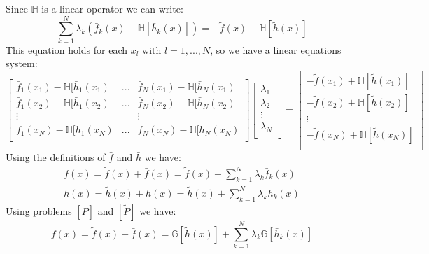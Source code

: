 Since $\mathbb{H}$ is a linear operator we can write:
\[
\sum_{k=1}^N\lambda_k\left(\bar f_k(x)-\mathbb{H}[\bar h_k(x)] \right) =-\widetilde{f}(x)+\mathbb{H}[\widetilde{h}(x)]
\]
This equation holds for each $x_l$ with $l=1,...,N$, so we have a linear equations system:
\begin{equation}
\begin{bmatrix}
\bar f_1(x_1)-\mathbb{H}[\bar h_1(x_1) & ... & \bar f_N(x_1)-\mathbb{H}[\bar h_N(x_1)\\
\bar f_1(x_2)-\mathbb{H}[\bar h_1(x_2) & ... & \bar f_N(x_2)-\mathbb{H}[\bar h_N(x_2)\\
\vdots & &\vdots\\
\bar f_1(x_N)-\mathbb{H}[\bar h_1(x_N) & ... & \bar f_N(x_N)-\mathbb{H}[\bar h_N(x_N)\\
\end{bmatrix}
\begin{bmatrix}
\lambda_1\\
\lambda_2\\
\vdots\\
\lambda_N\\
\end{bmatrix}
=
\begin{bmatrix}
-\widetilde{f}(x_1)+\mathbb{H}[\widetilde{h}(x_1)]\\
-\widetilde{f}(x_2)+\mathbb{H}[\widetilde{h}(x_2)]\\
\vdots\\
-\widetilde{f}(x_N)+\mathbb{H}[\widetilde{h}(x_N)]\\
\end{bmatrix}
\end{equation}
Using the definitions of $\bar f$ and $\bar h$ we have:
\[
\begin{array}{l}
f(x)=\widetilde{f}(x)+\bar f(x)=\widetilde{f}(x)+\sum\limits_{k=1}^N\lambda_k\bar f_k(x)\\[2ex]
h(x)=\widetilde{h}(x)+\bar h(x)=\widetilde{h}(x)+\sum\limits_{k=1}^N\lambda_k\bar h_k(x)
\end{array}
\]
Using problems $[\bar P]$ and $[\widetilde{P}]$ we have:
\[
f(x)=\widetilde{f}(x)+\bar f(x)=\mathbb{G}[\widetilde{h}(x)]+\sum_{k=1}^N \lambda_k \mathbb{G}[\bar h_k(x)]
\]

